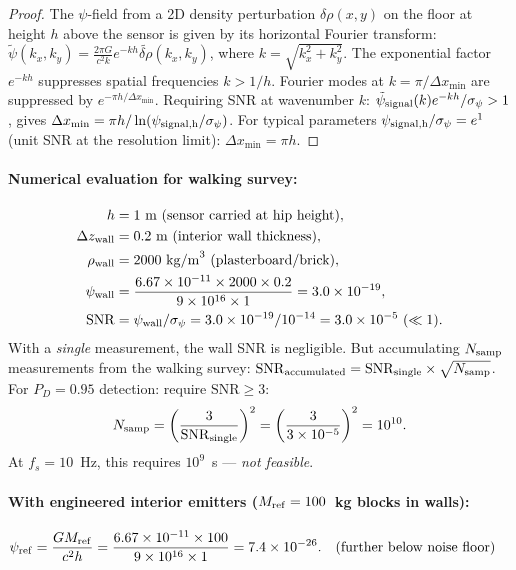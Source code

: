 \documentclass[aps,prd,twocolumn,superscriptaddress,nofootinbib]{revtex4-2}
\begin{document}
\begin{proof}
The $\psi$-field from a 2D density perturbation $\delta\rho(x,y)$
on the floor at height $h$ above the sensor is given by its horizontal
Fourier transform:
$\tilde\psi(k_x,k_y) = \frac{2\pi G}{c^2 k} e^{-kh} \widetilde{\delta\rho}(k_x,k_y)$,
where $k = \sqrt{k_x^2 + k_y^2}$.  The exponential factor $e^{-kh}$
suppresses spatial frequencies $k > 1/h$.  Fourier modes at
$k = \pi/\Delta x_{\min}$ are suppressed by $e^{-\pi h/\Delta x_{\min}}$.
Requiring SNR at wavenumber $k$:
$\tilde\psi_{\rm signal}(k) e^{-kh}/\sigma_\psi > 1$, gives
$\Delta x_{\min} = \pi h/\ln(\psi_{\rm signal,h}/\sigma_\psi)$.
For typical parameters $\psi_{\rm signal,h}/\sigma_\psi = e^1$
(unit SNR at the resolution limit): $\Delta x_{\min} = \pi h$.
\end{proof}

\paragraph{Numerical evaluation for walking survey:}
\begin{align}
  h &= 1~\mathrm{m}~\text{(sensor carried at hip height)}, \\
  \Delta z_{\rm wall} &= 0.2~\mathrm{m}~\text{(interior wall thickness)}, \\
  \rho_{\rm wall} &= 2000~\mathrm{kg/m}^3~\text{(plasterboard/brick)}, \\
  \psi_{\rm wall} &= \frac{6.67\times10^{-11}\times2000\times0.2}
  {9\times10^{16}\times1} = 3.0\times10^{-19}, \\
  \mathrm{SNR} &= \psi_{\rm wall}/\sigma_\psi
  = 3.0\times10^{-19}/10^{-14} = 3.0\times10^{-5}~(\ll 1).
\end{align}
With a \emph{single} measurement, the wall SNR is negligible.
But accumulating $N_{\rm samp}$ measurements from the walking survey:
$\mathrm{SNR}_{\rm accumulated} = \mathrm{SNR}_{\rm single}\times\sqrt{N_{\rm samp}}$.
For $P_D = 0.95$ detection: require $\mathrm{SNR} \geq 3$:
\begin{equation}
  N_{\rm samp} = \left(\frac{3}{\mathrm{SNR}_{\rm single}}\right)^2
  = \left(\frac{3}{3\times10^{-5}}\right)^2 = 10^{10}.
  \label{eq:nsamp-needed}
\end{equation}
At $f_s = 10$~Hz, this requires $10^9$~s --- \emph{not feasible}.

\paragraph{With engineered interior emitters ($M_{\rm ref} = 100$~kg
blocks in walls):}
\begin{align}
  \psi_{\rm ref} &= \frac{GM_{\rm ref}}{c^2 h}
  = \frac{6.67\times10^{-11}\times100}{9\times10^{16}\times1}
  = 7.4\times10^{-26}. \quad\text{(further below noise floor)}
\end{align}
\end{document}
